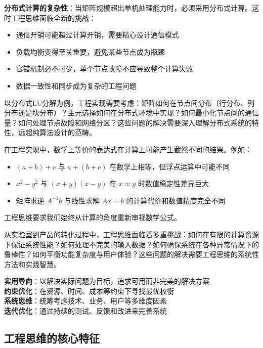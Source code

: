 \textbf{分布式计算的复杂性}：当矩阵规模超出单机处理能力时，必须采用分布式计算。这时工程思维面临全新的挑战：
\begin{itemize}
\item 通信开销可能超过计算开销，需要精心设计通信模式
\item 负载均衡变得至关重要，避免某些节点成为瓶颈
\item 容错机制必不可少，单个节点故障不应导致整个计算失败
\item 数据一致性和同步成为复杂的工程问题
\end{itemize}

以分布式LU分解为例，工程实现需要考虑：矩阵如何在节点间分布（行分布、列分布还是块分布）？主元选择如何在分布式环境中实现？如何最小化节点间的通信量？如何处理节点故障和网络分区？这些问题的解决需要深入理解分布式系统的特性，远超纯算法设计的范畴。

\begin{tcolorbox}[colback=red!5!white,colframe=red!75!black,title=警示：数学等价≠计算等价]
在工程实现中，数学上等价的表达式在计算上可能产生截然不同的结果。例如：
\begin{itemize}
\item $(a+b)+c$ 与 $a+(b+c)$ 在数学上相等，但浮点运算中可能不同
\item $x^2-y^2$ 与 $(x+y)(x-y)$ 在 $x \approx y$ 时数值稳定性差异巨大
\item 矩阵求逆 $A^{-1}b$ 与线性求解 $Ax=b$ 的计算代价和数值精度完全不同
\end{itemize}
工程思维要求我们始终从计算的角度重新审视数学公式。
\end{tcolorbox}

从实验室到产品的转化过程中，工程思维面临着多重挑战：如何在有限的计算资源下保证系统性能？如何处理不完美的输入数据？如何确保系统在各种异常情况下的鲁棒性？如何平衡功能复杂度与用户体验？这些问题的解决需要工程思维的系统性方法和实践智慧。

\begin{tcolorbox}[colback=orange!5!white,colframe=orange!75!black,title=核心概念：工程思维的四大支柱]
\textbf{实用导向}：以解决实际问题为目标，追求可用而非完美的解决方案\\
\textbf{约束优化}：在资源、时间、成本等约束下寻找最优权衡\\
\textbf{系统思维}：统筹考虑技术、业务、用户等多维度因素\\
\textbf{迭代优化}：通过持续的测试、反馈和改进来完善系统
\end{tcolorbox}

\subsection{工程思维的核心特征}


